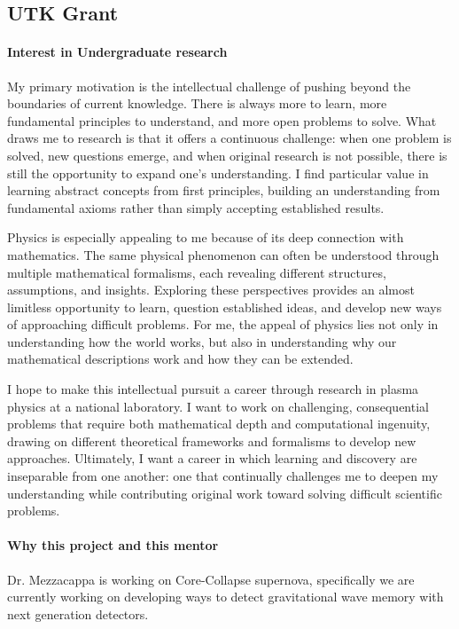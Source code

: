\subsection{UTK Grant}
\paragraph{Interest in Undergraduate research}


My primary motivation is the intellectual challenge of pushing beyond the boundaries of current knowledge. There is always more to learn, more fundamental principles to understand, and more open problems to solve. What draws me to research is that it offers a continuous challenge: when one problem is solved, new questions emerge, and when original research is not possible, there is still the opportunity to expand one's understanding. I find particular value in learning abstract concepts from first principles, building an understanding from fundamental axioms rather than simply accepting established results.

Physics is especially appealing to me because of its deep connection with mathematics. The same physical phenomenon can often be understood through multiple mathematical formalisms, each revealing different structures, assumptions, and insights. Exploring these perspectives provides an almost limitless opportunity to learn, question established ideas, and develop new ways of approaching difficult problems. For me, the appeal of physics lies not only in understanding how the world works, but also in understanding why our mathematical descriptions work and how they can be extended.

I hope to make this intellectual pursuit a career through research in plasma physics at a national laboratory. I want to work on challenging, consequential problems that require both mathematical depth and computational ingenuity, drawing on different theoretical frameworks and formalisms to develop new approaches. Ultimately, I want a career in which learning and discovery are inseparable from one another: one that continually challenges me to deepen my understanding while contributing original work toward solving difficult scientific problems.
\paragraph{Why this project and this mentor}

Dr. Mezzacappa is working on Core-Collapse supernova, specifically we are currently working on developing ways to detect
gravitational wave memory with next generation detectors.

